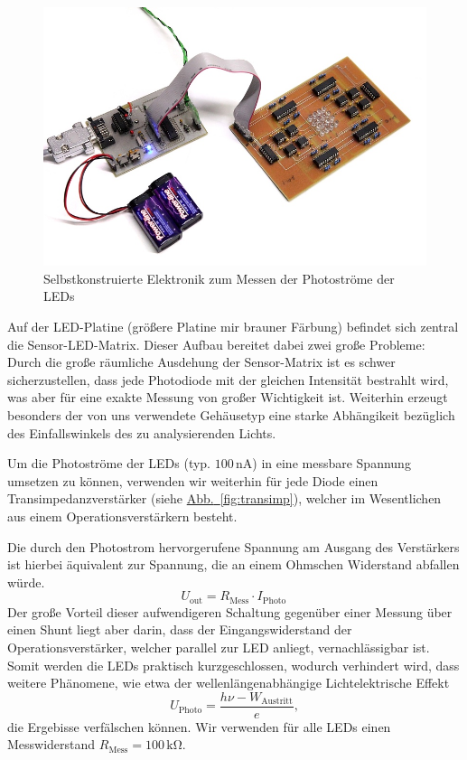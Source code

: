 \documentclass[11pt]{scrartcl}
\newcommand{\unit}[1]{\ensuremath{\,\mathrm{#1}}} %
\newcommand{\hypref}[2]{\hyperref[#2]{{#1}~\ref{#2}}}
\begin{document}
\begin{figure}[ht]
\begin{center}
\includegraphics[width=1.\textwidth]{platinen.jpg}
\end{center}
\vspace{-1.5\baselineskip}
\caption{Selbstkonstruierte Elektronik zum Messen der Photoströme der LEDs}
\label{fig:electronics}
\end{figure}

Auf der LED-Platine (größere Platine mir brauner Färbung) befindet sich zentral die Sensor-LED-Matrix. Dieser Aufbau bereitet dabei zwei große Probleme: Durch die große räumliche Ausdehung der Sensor-Matrix ist es schwer sicherzustellen, dass jede Photodiode mit der gleichen Intensität bestrahlt wird, was aber für eine exakte Messung von großer Wichtigkeit ist. Weiterhin erzeugt besonders der von uns verwendete Gehäusetyp eine starke Abhängikeit bezüglich des Einfallswinkels des zu analysierenden Lichts.

Um die Photoströme der LEDs (typ. $100 \unit{nA}$) in eine messbare Spannung umsetzen zu können, verwenden wir weiterhin für jede Diode einen Transimpedanzverstärker (siehe \hypref{Abb.}{fig:transimp}), welcher im Wesentlichen aus einem Operationsverstärkern besteht. 

Die durch den Photostrom hervorgerufene Spannung am Ausgang des Verstärkers ist hierbei äquivalent zur Spannung, die an einem Ohmschen Widerstand abfallen würde.
\begin{equation*}
U_{\text{out}} = R_{\text{Mess}} \cdot I_{\text{Photo}}\,
\end{equation*}
Der große Vorteil dieser aufwendigeren Schaltung gegenüber einer Messung über einen Shunt liegt aber darin, dass der Eingangswiderstand der Operationsverstärker, welcher parallel zur LED anliegt, vernachlässigbar ist. Somit werden die LEDs praktisch kurzgeschlossen, wodurch verhindert wird, dass weitere Phänomene, wie etwa der wellenlängenabhängige Lichtelektrische Effekt
\begin{equation*}
U_{\text{Photo}} = \frac {h \nu - W_{\text{Austritt}}} {e},
\end{equation*}
die Ergebisse verfälschen können. Wir verwenden für alle LEDs einen Messwiderstand $R_{\text{Mess}} = 100 \unit{k \Omega}$.
\end{document}
